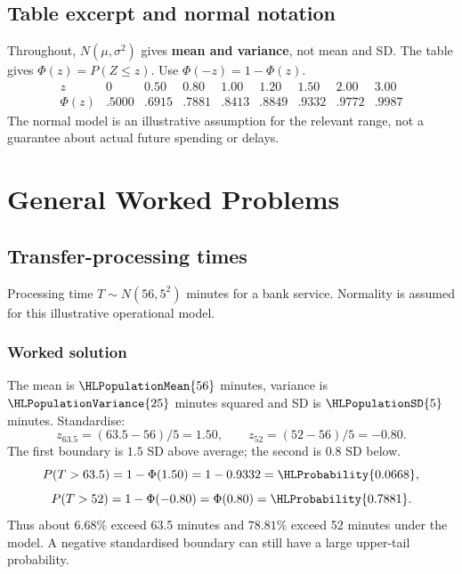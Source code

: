 \subsection{Table excerpt and normal notation}
Throughout, $N(\mu,\sigma^2)$ gives \textbf{mean and variance}, not mean and SD. The table gives $\Phi(z)=P(Z\le z)$. Use $\Phi(-z)=1-\Phi(z)$.
\[
\begin{array}{c|rrrrrrrr}
z&0&0.50&0.80&1.00&1.20&1.50&2.00&3.00\\ \hline
\Phi(z)&.5000&.6915&.7881&.8413&.8849&.9332&.9772&.9987
\end{array}
\]
The normal model is an illustrative assumption for the relevant range, not a guarantee about actual future spending or delays.
\section{General Worked Problems}\label{sec:general-worked}

\subsection{Transfer-processing times}\label{prob:sec:general-worked0}
Processing time $T\sim N(56,5^2)$ minutes for a bank service. Normality is assumed for this illustrative operational model.
\subsubsection*{Worked solution}\label{sol:sec:general-worked0}
The mean is $\HLPopulationMean{56}$ minutes, variance is $\HLPopulationVariance{25}$ minutes squared and SD is $\HLPopulationSD{5}$ minutes. Standardise:
\[
z_{63.5}=(63.5-56)/5=1.50,\qquad
z_{52}=(52-56)/5=-0.80.
\]
The first boundary is $1.5$ SD above average; the second is $0.8$ SD below.
\[
P(T>63.5)=1-\Phi(1.50)=1-0.9332=\HLProbability{0.0668},
\]
\[
P(T>52)=1-\Phi(-0.80)=\Phi(0.80)=\HLProbability{0.7881}.
\]
Thus about $6.68\%$ exceed 63.5 minutes and $78.81\%$ exceed 52 minutes under the model. A negative standardised boundary can still have a large upper-tail probability.


